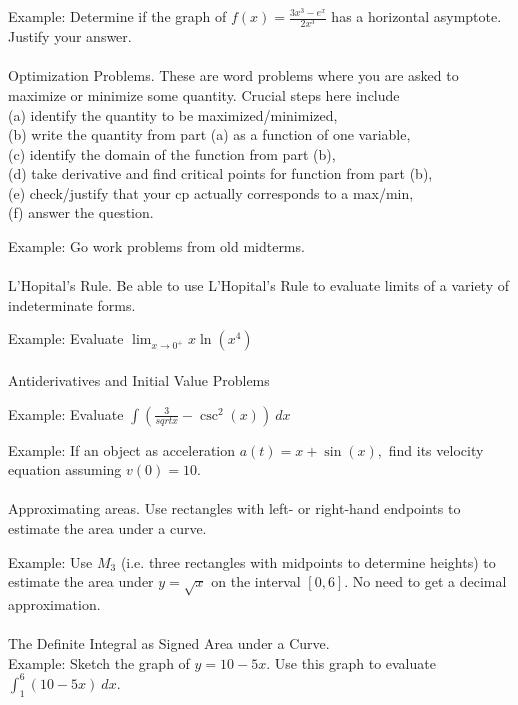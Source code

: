 \documentclass[11pt,fleqn]{article}
\begin{document}
Example: Determine if the graph of $f(x)=\frac{3x^3-e^x}{2x^3}$ has a horizontal asymptote. Justify your answer.\\

\noindent {}\\
Optimization Problems. These are word problems where you are asked to maximize or minimize some quantity. Crucial steps here include\\
 (a) identify the quantity to be maximized/minimized, \\
 (b) write the quantity from part (a) as a function of one variable,\\
 (c) identify the domain of the function from part (b), \\
 (d) take derivative and find critical points for function from part (b), \\
 (e) check/justify that your cp actually corresponds to a max/min,\\
 (f) answer the question.
 
 Example: Go work problems from old midterms.\\ 

\noindent {}\\
L'Hopital's Rule. Be able to use L'Hopital's Rule to evaluate limits of a variety of indeterminate forms.

Example: Evaluate $\lim_{x \to 0^+} x \ln(x^4)$\\

\noindent {}\\
Antiderivatives and Initial Value Problems 

Example: Evaluate $\int (\frac{3}{sqrt{x}}-\csc^2(x)) \: dx$

Example: If an object as acceleration $a(t) = x + \sin(x),$ find its velocity equation assuming $v(0)=10.$\\


\noindent {}\\
Approximating areas. Use rectangles with left- or right-hand endpoints to estimate the area under a curve. 

Example: Use $M_3$ (i.e. three rectangles with midpoints to determine heights) to estimate the area under $y=\sqrt{x}$ on the interval $[0,6].$ No need to get a decimal approximation. \\


\noindent {}\\
The Definite Integral as Signed Area under a Curve.\\

Example: Sketch the graph of $y=10 - 5x.$ Use this graph to evaluate $\int_{1}^6 (10-5x) \:dx$.
\end{document}
